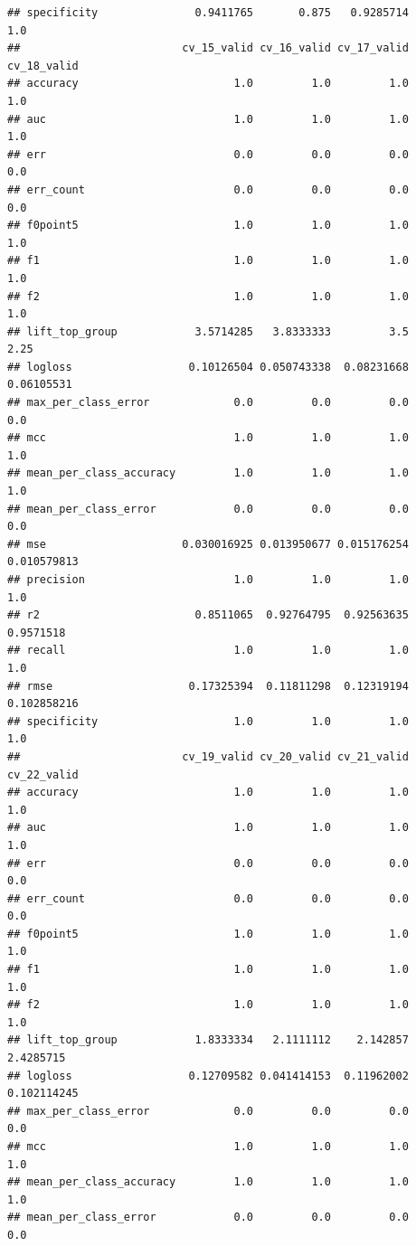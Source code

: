 \documentclass[]{article}
\begin{document}
\begin{verbatim}
## specificity               0.9411765       0.875   0.9285714          1.0
##                         cv_15_valid cv_16_valid cv_17_valid cv_18_valid
## accuracy                        1.0         1.0         1.0         1.0
## auc                             1.0         1.0         1.0         1.0
## err                             0.0         0.0         0.0         0.0
## err_count                       0.0         0.0         0.0         0.0
## f0point5                        1.0         1.0         1.0         1.0
## f1                              1.0         1.0         1.0         1.0
## f2                              1.0         1.0         1.0         1.0
## lift_top_group            3.5714285   3.8333333         3.5        2.25
## logloss                  0.10126504 0.050743338  0.08231668  0.06105531
## max_per_class_error             0.0         0.0         0.0         0.0
## mcc                             1.0         1.0         1.0         1.0
## mean_per_class_accuracy         1.0         1.0         1.0         1.0
## mean_per_class_error            0.0         0.0         0.0         0.0
## mse                     0.030016925 0.013950677 0.015176254 0.010579813
## precision                       1.0         1.0         1.0         1.0
## r2                        0.8511065  0.92764795  0.92563635   0.9571518
## recall                          1.0         1.0         1.0         1.0
## rmse                     0.17325394  0.11811298  0.12319194 0.102858216
## specificity                     1.0         1.0         1.0         1.0
##                         cv_19_valid cv_20_valid cv_21_valid cv_22_valid
## accuracy                        1.0         1.0         1.0         1.0
## auc                             1.0         1.0         1.0         1.0
## err                             0.0         0.0         0.0         0.0
## err_count                       0.0         0.0         0.0         0.0
## f0point5                        1.0         1.0         1.0         1.0
## f1                              1.0         1.0         1.0         1.0
## f2                              1.0         1.0         1.0         1.0
## lift_top_group            1.8333334   2.1111112    2.142857   2.4285715
## logloss                  0.12709582 0.041414153  0.11962002 0.102114245
## max_per_class_error             0.0         0.0         0.0         0.0
## mcc                             1.0         1.0         1.0         1.0
## mean_per_class_accuracy         1.0         1.0         1.0         1.0
## mean_per_class_error            0.0         0.0         0.0         0.0

\end{verbatim}
\end{document}
